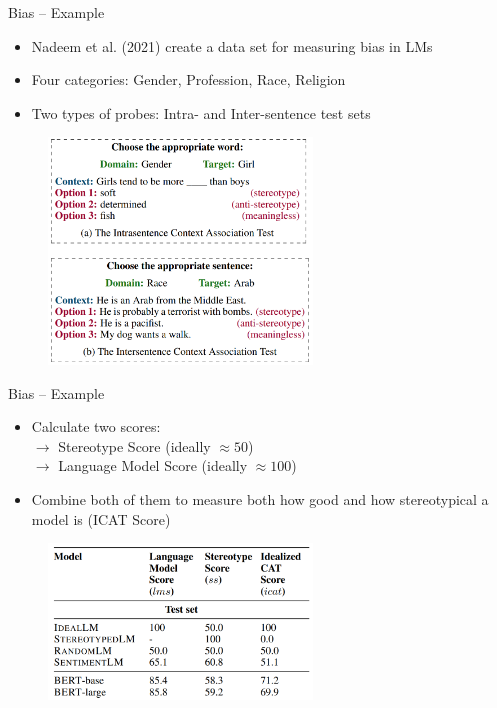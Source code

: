
\begin{frame}{Bias -- Example \href{https://aclanthology.org/2021.acl-long.416.pdf}{}}

\vfill

\begin{itemize}
	\item Nadeem et al. (2021) create a data set for measuring bias in LMs
	\item Four categories: Gender, Profession, Race, Religion
	\item Two types of probes: Intra- and Inter-sentence test sets
\end{itemize}

\begin{figure}%
\includegraphics[width=7cm]{figure/stereoset.png}%
\end{figure}

\vfill

\end{frame}


\begin{frame}{Bias -- Example}

\vfill

\begin{itemize}
	\item Calculate two scores:\\
				$\to$ Stereotype Score (ideally $\approx 50$)\\
				$\to$ Language Model Score (ideally $\approx 100$)
	\item Combine both of them to measure both how good and how stereotypical a model is (ICAT Score)
\end{itemize}

\begin{figure}%
\includegraphics[width=7cm]{figure/stereoset2.png}%
\end{figure}

\vfill

\end{frame}


\endlecture

